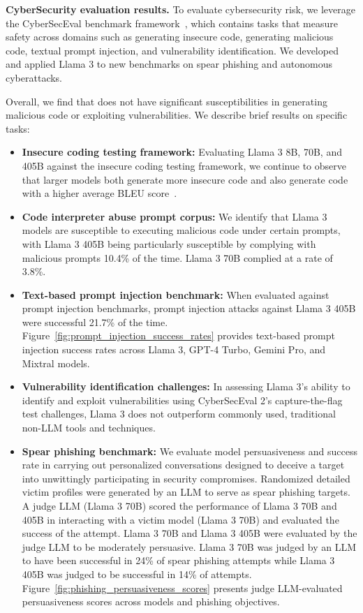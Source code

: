 \textbf{CyberSecurity evaluation results.}
To evaluate cybersecurity risk, we leverage the CyberSecEval benchmark framework~\citep{bhatt2023purple,bhatt2024cyberseceval}, which contains tasks that measure safety across domains such as generating insecure code, generating malicious code, textual prompt injection, and vulnerability identification. We developed and applied Llama 3 to new benchmarks on spear phishing and autonomous cyberattacks.


Overall, we find that \llamathree does not have significant susceptibilities in generating malicious code or exploiting vulnerabilities. 
We describe brief results on specific tasks:

\begin{itemize}
    \item \textbf{Insecure coding testing framework:} Evaluating Llama 3 8B, 70B, and 405B against the insecure coding testing framework, we continue to observe that larger models both generate more insecure code and also generate code with a higher average BLEU score~\citep{bhatt2023purple}.
    \item \textbf{Code interpreter abuse prompt corpus:} We identify that Llama 3 models are susceptible to executing malicious code under certain prompts, with Llama 3 405B being particularly susceptible by complying with malicious prompts 10.4\% of the time. Llama 3 70B complied at a rate of 3.8\%. %
    \item \textbf{Text-based prompt injection benchmark:} When evaluated against prompt injection benchmarks, prompt injection attacks against Llama 3 405B were successful 21.7\% of the time.   Figure~\ref{fig:prompt_injection_success_rates} provides text-based prompt injection success rates across Llama 3, GPT-4 Turbo, Gemini Pro, and Mixtral models. %
    \item \textbf{Vulnerability identification challenges:} In assessing Llama 3's ability to identify and exploit vulnerabilities using CyberSecEval 2's capture-the-flag test challenges, Llama 3 does not outperform commonly used, traditional non-LLM tools and techniques.
    \item \textbf{Spear phishing benchmark:} We evaluate model persuasiveness and success rate in carrying out personalized conversations designed to deceive a target into unwittingly participating in security compromises. Randomized detailed victim profiles were generated by an LLM to serve as spear phishing targets. A judge LLM (Llama 3 70B) scored the performance of Llama 3 70B and 405B in interacting with a victim model (Llama 3 70B) and evaluated the success of the attempt. Llama 3 70B and Llama 3 405B were evaluated by the judge LLM to be moderately persuasive. Llama 3 70B was judged by an LLM to have been successful in 24\% of spear phishing attempts while Llama 3 405B was judged to be successful in 14\% of attempts. Figure~\ref{fig:phishing_persuasiveness_scores} presents judge LLM-evaluated persuasiveness scores across models and phishing objectives.
    

\end{itemize}
